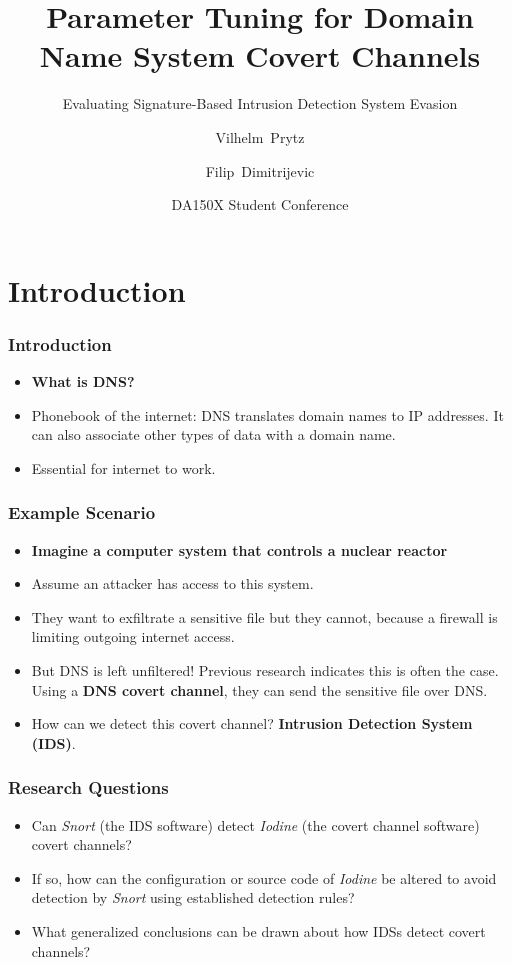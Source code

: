 \documentclass{beamer}
\title[Student Conference] %
{Parameter Tuning for Domain Name System Covert Channels}
\subtitle{Evaluating Signature-Based Intrusion Detection System Evasion}
\author[Prytz, Dimitrijevic] %
{Vilhelm~Prytz \and Filip~Dimitrijevic}
\institute[KTH]{EECS\\ KTH Royal Institute of Technology}
\date[May 28, 2025] %
{DA150X Student Conference}
\begin{document}
\frame{\titlepage}


\section{Introduction}


\begin{frame}
\frametitle{Introduction}

\begin{itemize}
    \item<1->\textbf{What is DNS?}
    \item<2->Phonebook of the internet: DNS translates domain names to IP addresses. It can also associate other types of data with a domain name.
    \item<3->Essential for internet to work.
\end{itemize}

\end{frame}

\begin{frame}
\frametitle{Example Scenario}

\begin{itemize}
    \item<1->\textbf{Imagine a computer system that controls a nuclear reactor}
    \item<2->Assume an attacker has access to this system.
    \item<3->They want to exfiltrate a sensitive file but they cannot, because a firewall is limiting outgoing internet access.
    \item<4->But DNS is left unfiltered! Previous research indicates this is often the case. Using a \textbf{DNS covert channel}, they can send the sensitive file over DNS.
    \item<5->How can we detect this covert channel? \textbf{Intrusion Detection System (IDS)}.
\end{itemize}
    
\end{frame}


\begin{frame}
\frametitle{Research Questions}

\begin{itemize}
    \item<1-> Can \textit{Snort} (the IDS software) detect \textit{Iodine} (the covert channel software) covert channels?
    \item<2-> If so, how can the configuration or source code of \textit{Iodine} be altered to avoid detection by \textit{Snort} using established detection rules?
    \item<3-> What generalized conclusions can be drawn about how IDSs detect covert channels?
\end{itemize}
\end{frame}
\end{document}
